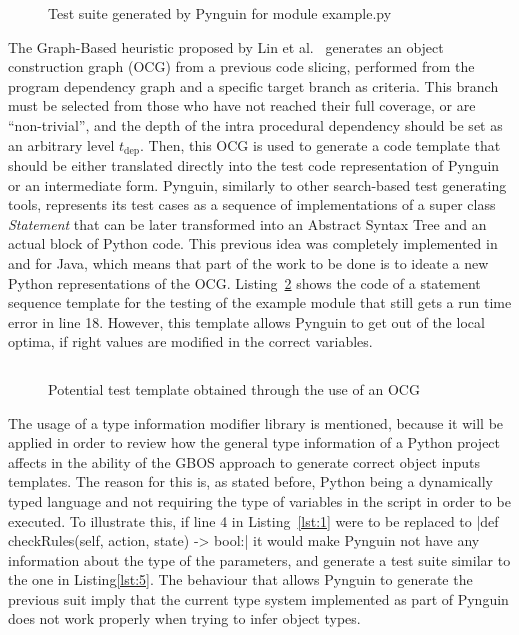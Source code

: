 \documentclass[%
  chapterprefix=false,%
  open=right,%
  twoside=true,%
  paper=a4,%
  logofile={Figures/logo.png},%
  thesistype=master,%
  UKenglish,%
]{se2thesis}
\begin{document}
\begin{figure}
    \inputminted[linenos]{python}{Figures/test1.py}
    \caption{Test suite generated by Pynguin for module example.py\label{lst:3}}
\end{figure}

The Graph-Based heuristic proposed by Lin et al.~\cite{DBLP:conf/sigsoft/0001O00D21} generates an object construction graph (OCG) from a previous code slicing, performed from the program dependency graph and a specific target branch as criteria.
This branch must be selected from those who have not reached their full coverage, or are ``non-trivial'', and the depth of the intra procedural dependency should be set as an arbitrary level $t_{\text{dep}}$.
Then, this OCG is used to generate a code template that should be either translated directly into the test code representation of Pynguin or an intermediate form.
Pynguin, similarly to other search-based test generating tools, represents its test cases as a sequence of implementations of a super class \textit{Statement} that can be later transformed into an Abstract Syntax Tree and an actual block of Python code.
This previous idea was completely implemented in and for Java, which means that part of the work to be done is to ideate a new Python representations of the OCG.\@
Listing~\ref{lst:4} shows the code of a statement sequence template for the testing of the example module that still gets a run time error in line 18.
However, this template allows Pynguin to get out of the local optima, if right values are modified in the correct variables.

\begin{figure}
  \inputminted[linenos]{python}{Figures/template.py}
  \caption{Potential test template obtained through the use of an OCG\label{lst:4}}
\end{figure}

The usage of a type information modifier library is mentioned, because it will be applied in order to review how the general type information of a Python project affects in the ability of the GBOS approach to generate correct object inputs templates.
The reason for this is, as stated before, Python being a dynamically typed language and not requiring the type of variables in the script in order to be executed.
To illustrate this, if line 4 in Listing~\ref{lst:1} were to be replaced to |def checkRules(self, action, state) -> bool:| it would make Pynguin not have any information about the type of the parameters, and generate a test suite similar to the one in Listing\ref{lst:5}.
The behaviour that allows Pynguin to generate the previous suit imply that the current type system implemented as part of Pynguin does not work properly when trying to infer object types.
\end{document}
